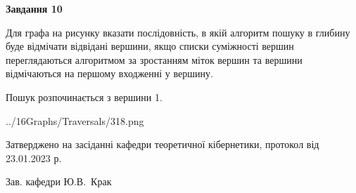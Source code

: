 \documentclass[12pt, ukrainian]{article}
\begin{document}
{\begin {large}
{\begin {center}\textbf{Завдання 10}\end {center}}\par
Для графа на рисунку вказати послідовність, в якій алгоритм пошуку в глибину буде відмічати відвідані вершини, якщо списки суміжності вершин переглядаються алгоритмом за зростанням міток вершин та вершини відмічаються на першому вход\-женні у вершину.\par
Пошук розпочинається з вершини 1.\par

\begin{center}
	{../16Graphs/Traversals/318.png}
\end{center}\par
\newpage


\end {large}
}
{\smallskip \begin {small} Затверджено на засіданні кафедри теоретичної кібернетики, протокол  від   23.01.2023 р.\par\smallskip\smallskip
{\parbox {6.5 cm}{Зав. кафедри \dotfill Ю.В.~Крак}} \end{small}}
\end{document}

